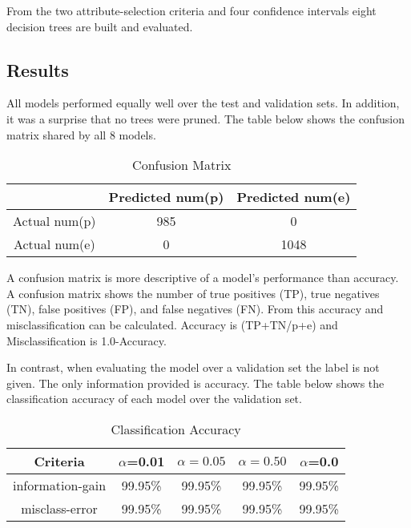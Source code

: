 \documentclass{IEEEtran}
\begin{document}
From the two attribute-selection criteria and four confidence
intervals eight decision trees are built and evaluated.

\subsection{Results}
All models performed equally well over the test and validation
sets. In addition,  it was a surprise that no trees were pruned. The
table below shows the confusion matrix shared by all 8 models.

\begin{table}[ht]
  \caption{Confusion Matrix}
  \centering
  \begin{tabular}{c c c }
  \hline\hline
                & Predicted num(p) & Predicted num(e) \\ [0.5ex]
  \hline
  Actual num(p) &              985 &                0 \\
  Actual num(e) &                0 &             1048 \\ [1ex]
  \hline
  \end{tabular}
  \label{table:nonlin}
\end{table}

A confusion matrix is more descriptive of a model's performance than
accuracy. A confusion matrix shows the number of true positives (TP), true
negatives (TN), false positives (FP), and false negatives (FN). From this accuracy
and misclassification can be calculated. Accuracy is (TP+TN/p+e) and
Misclassification is 1.0-Accuracy.

In contrast, when evaluating the model over a validation set the label
is not given. The only information provided is accuracy. The table
below shows the classification accuracy of each model over the
validation set.

\begin{table}[ht]
  \caption{Classification Accuracy}
  \centering
  \begin{tabular}{c c c c c}
  \hline\hline
  Criteria & $\alpha$=0.01 & $\alpha=0.05$ & $\alpha=0.50$ & $\alpha$=0.0 \\ [0.5ex]
  \hline
  information-gain & 99.95\% & 99.95\% & 99.95\% & 99.95\% \\
  misclass-error   & 99.95\% & 99.95\% & 99.95\% & 99.95\% \\ [1ex]
  \hline
  \end{tabular}
  \label{table:nonlin}
\end{table}
\end{document}
